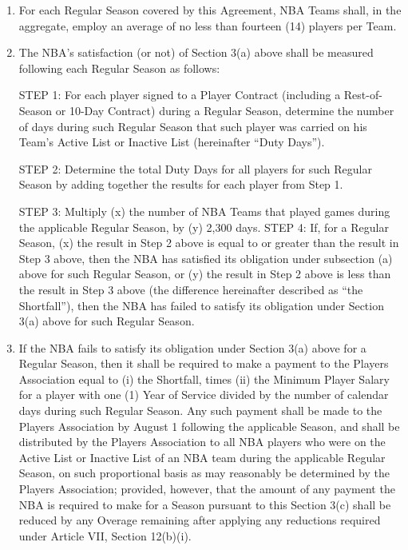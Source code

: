 \documentclass[
]{book}
\begin{document}
\begin{enumerate}
\def\labelenumi{(\alph{enumi})}
\item
  For each Regular Season covered by this Agreement, NBA Teams shall, in the aggregate, employ an average of no less than fourteen (14) players per Team.
\item
  The NBA's satisfaction (or not) of Section 3(a) above shall be measured following each Regular Season as follows:

  STEP 1: For each player signed to a Player Contract (including a Rest-of-Season or 10-Day Contract) during a Regular Season, determine the number of days during such Regular Season that such player was carried on his Team's Active List or Inactive List (hereinafter ``Duty Days'').

  STEP 2: Determine the total Duty Days for all players for such Regular Season by adding together the results for each player from Step 1.

  STEP 3: Multiply (x) the number of NBA Teams that played games during the applicable Regular Season, by (y) 2,300 days.
  STEP 4: If, for a Regular Season, (x) the result in Step 2 above is equal to or greater than the result in Step 3 above, then the NBA has satisfied its obligation under subsection (a) above for such Regular Season, or (y) the result in Step 2 above is less than the result in Step 3 above (the difference hereinafter described as ``the Shortfall''), then the NBA has failed to satisfy its obligation under Section 3(a) above for such Regular Season.
\item
  If the NBA fails to satisfy its obligation under Section 3(a) above for a Regular Season, then it shall be required to make a payment to the Players Association equal to (i) the Shortfall, times (ii) the Minimum Player Salary for a player with one (1) Year of Service divided by the number of calendar days during such Regular Season. Any such payment shall be made to the Players Association by August 1 following the applicable Season, and shall be distributed by the Players Association to all NBA players who were on the Active List or Inactive List of an NBA team during the applicable Regular Season, on such proportional basis as may reasonably be determined by the Players Association; provided, however, that the amount of any payment the NBA is required to make for a Season pursuant to this Section 3(c) shall be reduced by any Overage remaining after applying any reductions required under Article VII, Section 12(b)(i).
\end{enumerate}
\end{document}
